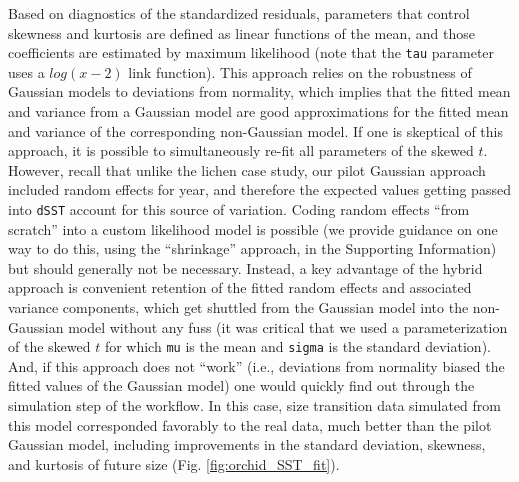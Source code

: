 \documentclass[12pt]{article}
\begin{document}
Based on diagnostics of the standardized residuals, parameters that control skewness and kurtosis are defined as linear functions of the mean, and those coefficients are estimated by maximum likelihood (note that the \verb|tau| parameter uses a $log(x-2)$ link function). 
This approach relies on the robustness of Gaussian models to deviations from normality, which implies that the fitted mean and variance from a Gaussian model are good approximations for the fitted mean and variance of the corresponding non-Gaussian model. 
If one is skeptical of this approach, it is possible to simultaneously re-fit all parameters of the skewed $t$. 
However, recall that unlike the lichen case study, our pilot Gaussian approach included random effects for year, and therefore the expected values getting passed into \verb|dSST| account for this source of variation. 
Coding random effects ``from scratch'' into a custom likelihood model is possible (we provide guidance on one way to do this, using the ``shrinkage'' approach, in the Supporting Information) but should generally not be necessary. 
Instead, a key advantage of the hybrid approach is convenient retention of the fitted random effects and associated variance components, which get shuttled from the Gaussian model into the non-Gaussian model without any fuss (it was critical that we used a parameterization of the skewed $t$ for which \verb|mu| is the mean and \verb|sigma| is the standard deviation). 
And, if this approach does not ``work'' (i.e., deviations from normality biased the fitted values of the Gaussian model) one would quickly find out through the simulation step of the workflow.
In this case, size transition data simulated from this model corresponded favorably to the real data, much better than the pilot Gaussian model, including improvements in the standard deviation, skewness, and kurtosis of future size (Fig. \ref{fig:orchid_SST_fit}). 
\end{document}

